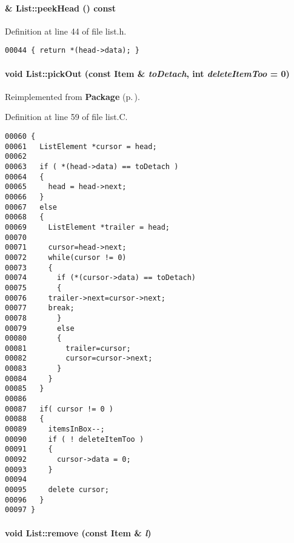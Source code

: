 \paragraph{ \& List::peek\-Head () const\hspace{0.3cm}{\tt  [inline]}}\hfill



Definition at line 44 of file list.h.\small\begin{verbatim}00044 { return *(head->data); }
\end{verbatim}\normalsize 
\label{List_a4}
\paragraph{\setlength{\rightskip}{0pt plus 5cm}void List::pick\-Out (const {\bf Item} \& {\em to\-Detach}, int {\em delete\-Item\-Too} = 0)\hspace{0.3cm}{\tt  [virtual]}}\hfill



Reimplemented from {\bf Package} {\rm (p.\,\pageref{Package_a3})}.

Definition at line 59 of file list.C.\small\begin{verbatim}00060 {
00061   ListElement *cursor = head;
00062   
00063   if ( *(head->data) == toDetach )
00064   {
00065     head = head->next;
00066   }
00067   else  
00068   {
00069     ListElement *trailer = head;
00070     
00071     cursor=head->next;
00072     while(cursor != 0)
00073     {
00074       if (*(cursor->data) == toDetach)
00075       {
00076     trailer->next=cursor->next;
00077     break;
00078       }
00079       else
00080       {
00081         trailer=cursor;
00082         cursor=cursor->next;
00083       }
00084     }
00085   } 
00086   
00087   if( cursor != 0 )
00088   {
00089     itemsInBox--;
00090     if ( ! deleteItemToo )
00091     {
00092       cursor->data = 0;       
00093     }
00094     
00095     delete cursor;
00096   }
00097 }
\end{verbatim}\normalsize 
\label{List_a5}
\paragraph{\setlength{\rightskip}{0pt plus 5cm}void List::remove (const {\bf Item} \& {\em l})\hspace{0.3cm}{\tt  [inline]}}\hfill



